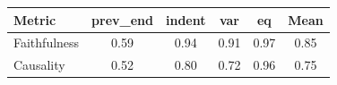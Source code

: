 \begin{tabular}{lccccc}
\toprule
Metric & prev\_end & indent & var & eq & Mean \\
\midrule
Faithfulness & 0.59 & 0.94 & 0.91 & 0.97 & 0.85 \\
Causality & 0.52 & 0.80 & 0.72 & 0.96 & 0.75 \\
\bottomrule
\end{tabular}
